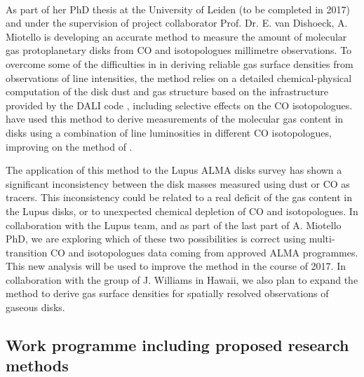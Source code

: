 \documentclass[10pt,fleqn,twoside]{article}
\begin{document}
\vspace{1em}{\Tcol\bf Disk gas masses from ALMA observations}\\
As part of her PhD thesis at the University of Leiden (to be completed in 2017) and under the supervision of project collaborator Prof. Dr. E. van Dishoeck, A. Miotello is developing an accurate method to measure the amount of molecular gas protoplanetary disks from CO and isotopologues millimetre observations. To overcome some of the difficulties in in deriving reliable gas surface densities from observations of line intensities, the method relies on a detailed chemical-physical computation of the disk dust and gas structure based on the infrastructure provided by the DALI code \citep{2012A&A...541A..91B}, including selective effects on the CO isotopologues. \citet{2016A&A...594A..85M} have used this method to derive measurements of the molecular gas content in disks using a combination of line luminosities in different CO isotopologues, improving on the method of \citet{2014ApJ...788...59W}.

The application of this method to the Lupus ALMA disks survey \citet[][see also Fig.~\ref{f_LADS}]{2016arXiv161201538M} has shown a significant inconsistency between the disk masses measured using dust or CO as tracers. This inconsistency could be related to a real deficit of the gas content in the Lupus disks, or to unexpected chemical depletion of CO and isotopologues. In collaboration with the Lupus team, and as part of the last part of A. Miotello PhD, we are exploring which of these two possibilities is correct using multi-transition CO and isotopologues data coming from approved ALMA programmes. This new analysis will be used to improve the method in the course of 2017. In collaboration with the group of J. Williams in Hawaii, we also plan to expand the method to derive gas surface densities for spatially resolved observations of gaseous disks.

\subsection{Work programme including proposed research methods}
\label{s_work}


%
%
\end{document}
